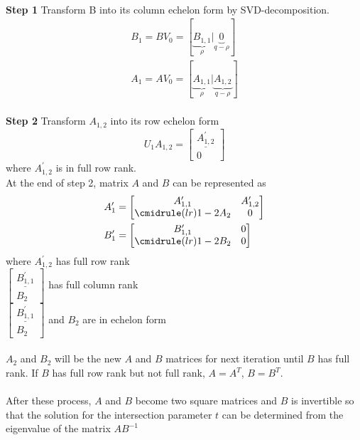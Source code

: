 \paragraph{} 
\textbf{Step 1}
	Transform B into its column echelon form by SVD-decomposition.
	\begin{equation}
	\begin{aligned}
		B_1 = BV_0 = [\underbrace{B_{1,1}}_{\rho} |\underbrace{0}_{q-\rho}]	\\
		A_1 = AV_0 = [\underbrace{A_{1,1}}_{\rho} |\underbrace{A_{1,2}}_{q-\rho}]
	\end{aligned}
	\end{equation}
\paragraph{} 
\textbf{Step 2}
	Transform $A_{1,2}$ into its row echelon form
	\begin{equation}
		U_1A_{1,2} = 
		\begin{bmatrix}
			\underline{A^\prime_{1,2}}\\
			0
		\end{bmatrix}
	\end{equation}
	where $A^\prime_{1,2}$ is in full row rank.\\
	At the end of step 2, matrix $A$ and $B$ can be represented as
	\begin{equation}
	\begin{aligned}
	A^\prime_1 &=
	\begin{bmatrix}
		A^\prime_{1,1} & A^\prime_{1,2} \\
		\cmidrule(lr){1-2}
		A_2 & 0
	\end{bmatrix}\\
	B^\prime_1 &=
	\begin{bmatrix}
		B^\prime_{1,1} & 0\\
		\cmidrule(lr){1-2}
		B_2 & 0
	\end{bmatrix}
	\end{aligned}
	\end{equation}
where $A^\prime_{1,2}$ has full row rank\\
$
\begin{bmatrix}
\underline{B^\prime_{1,1}}\\
B_2
\end{bmatrix}
$ has full column rank\\
$
\begin{bmatrix}
\underline{B^\prime_{1,1}}\\
B_2
\end{bmatrix}
$ and $B_2$ are in echelon form
\paragraph{}
$A_2$ and $B_2$ will be the new $A$ and $B$ matrices for next iteration until $B$ has full rank. If $B$ has full row rank but not full rank, $A=A^T$, $B=B^T$.
\paragraph{}
After these process, $A$ and $B$ become two square matrices and $B$ is invertible so that the solution for the intersection parameter $t$ can be determined from the eigenvalue of the matrix $AB^{-1}$
